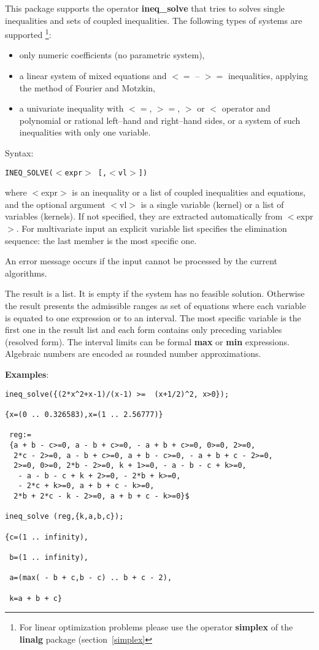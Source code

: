 \documentclass[11pt,letterpaper]{book}
\makeatletter
\newcommand{\underscore}{\_}
\newcommand{\ttindex}[1]{{\renewcommand{\_}{\protect\underscore}%
                          \index{#1@{\tt #1}}}}
\makeatother
\begin{document}
\ttindex{INEQ}

This package supports the operator {\bf ineq\_solve} that
tries to solves single inequalities and sets of coupled inequalities.
The following types of systems are supported
\footnote{For linear optimization problems please use the operator
{\bf simplex} of the {\bf linalg} package (section~\ref{simplex}}:
\begin{itemize}
\item only numeric coefficients (no parametric system),
\item a linear system of mixed equations and $<=$ -- $>=$
     inequalities, applying the method of Fourier and Motzkin,
\item a univariate inequality with $<=$, $>=$, $>$ or $<$ operator
     and polynomial or rational left--hand and right--hand sides,
     or a system of such inequalities with only one variable.
\end{itemize}

Syntax:
\begin{center}
{\tt INEQ\_SOLVE($<$expr$>$ [,$<$vl$>$])}
\end{center}
where $<$expr$>$ is an inequality or a list of coupled inequalities
and equations, and the optional argument $<$vl$>$ is a single
variable (kernel) or a list of variables (kernels).  If not
specified, they are extracted automatically from $<$expr$>$.
For multivariate input an explicit variable list specifies the
elimination sequence: the last member is the most specific one.

An error message occurs if the input cannot be processed by the
current algorithms.

The result is a list.  It is empty if the system has no feasible
solution.  Otherwise the result presents the admissible ranges as set
of equations where each variable is equated to one expression or to an
interval.  The most specific variable is the first one in the result
list and each form contains only preceding variables (resolved form).
The interval limits can be formal {\bf max} or {\bf min} expressions.
Algebraic numbers are encoded as rounded number approximations.

\noindent
{\bf Examples}:

{\small\begin{verbatim}
ineq_solve({(2*x^2+x-1)/(x-1) >=  (x+1/2)^2, x>0});

{x=(0 .. 0.326583),x=(1 .. 2.56777)}

 reg:=
 {a + b - c>=0, a - b + c>=0, - a + b + c>=0, 0>=0, 2>=0,
  2*c - 2>=0, a - b + c>=0, a + b - c>=0, - a + b + c - 2>=0,
  2>=0, 0>=0, 2*b - 2>=0, k + 1>=0, - a - b - c + k>=0,
   - a - b - c + k + 2>=0, - 2*b + k>=0,
   - 2*c + k>=0, a + b + c - k>=0,
  2*b + 2*c - k - 2>=0, a + b + c - k>=0}$

ineq_solve (reg,{k,a,b,c});

{c=(1 .. infinity),

 b=(1 .. infinity),

 a=(max( - b + c,b - c) .. b + c - 2),

 k=a + b + c}
\end{verbatim}}
\end{document}
